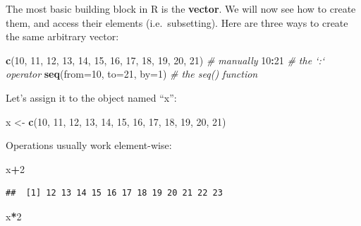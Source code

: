 \documentclass[]{book}
\newenvironment{Shaded}{\begin{snugshade}}{\end{snugshade}}
\newcommand{\KeywordTok}[1]{\textcolor[rgb]{0.13,0.29,0.53}{\textbf{#1}}}
\newcommand{\DataTypeTok}[1]{\textcolor[rgb]{0.13,0.29,0.53}{#1}}
\newcommand{\DecValTok}[1]{\textcolor[rgb]{0.00,0.00,0.81}{#1}}
\newcommand{\StringTok}[1]{\textcolor[rgb]{0.31,0.60,0.02}{#1}}
\newcommand{\CommentTok}[1]{\textcolor[rgb]{0.56,0.35,0.01}{\textit{#1}}}
\newcommand{\OperatorTok}[1]{\textcolor[rgb]{0.81,0.36,0.00}{\textbf{#1}}}
\newcommand{\NormalTok}[1]{#1}
\theoremstyle{definition}
\theoremstyle{definition}
\theoremstyle{definition}
\theoremstyle{remark}
\begin{document}
The most basic building block in R is the \textbf{vector}. We will now
see how to create them, and access their elements (i.e.~subsetting).
Here are three ways to create the same arbitrary vector:

\begin{Shaded}
\begin{Highlighting}[]
\KeywordTok{c}\NormalTok{(}\DecValTok{10}\NormalTok{, }\DecValTok{11}\NormalTok{, }\DecValTok{12}\NormalTok{, }\DecValTok{13}\NormalTok{, }\DecValTok{14}\NormalTok{, }\DecValTok{15}\NormalTok{, }\DecValTok{16}\NormalTok{, }\DecValTok{17}\NormalTok{, }\DecValTok{18}\NormalTok{, }\DecValTok{19}\NormalTok{, }\DecValTok{20}\NormalTok{, }\DecValTok{21}\NormalTok{) }\CommentTok{# manually}
\DecValTok{10}\OperatorTok{:}\DecValTok{21} \CommentTok{# the `:` operator                            }
\KeywordTok{seq}\NormalTok{(}\DataTypeTok{from=}\DecValTok{10}\NormalTok{, }\DataTypeTok{to=}\DecValTok{21}\NormalTok{, }\DataTypeTok{by=}\DecValTok{1}\NormalTok{) }\CommentTok{# the seq() function}
\end{Highlighting}
\end{Shaded}

Let's assign it to the object named ``x'':

\begin{Shaded}
\begin{Highlighting}[]
\NormalTok{x <-}\StringTok{ }\KeywordTok{c}\NormalTok{(}\DecValTok{10}\NormalTok{, }\DecValTok{11}\NormalTok{, }\DecValTok{12}\NormalTok{, }\DecValTok{13}\NormalTok{, }\DecValTok{14}\NormalTok{, }\DecValTok{15}\NormalTok{, }\DecValTok{16}\NormalTok{, }\DecValTok{17}\NormalTok{, }\DecValTok{18}\NormalTok{, }\DecValTok{19}\NormalTok{, }\DecValTok{20}\NormalTok{, }\DecValTok{21}\NormalTok{)  }
\end{Highlighting}
\end{Shaded}

Operations usually work element-wise:

\begin{Shaded}
\begin{Highlighting}[]
\NormalTok{x}\OperatorTok{+}\DecValTok{2}
\end{Highlighting}
\end{Shaded}

\begin{verbatim}
##  [1] 12 13 14 15 16 17 18 19 20 21 22 23
\end{verbatim}

\begin{Shaded}
\begin{Highlighting}[]
\NormalTok{x}\OperatorTok{*}\DecValTok{2}    
\end{Highlighting}
\end{Shaded}
\end{document}
